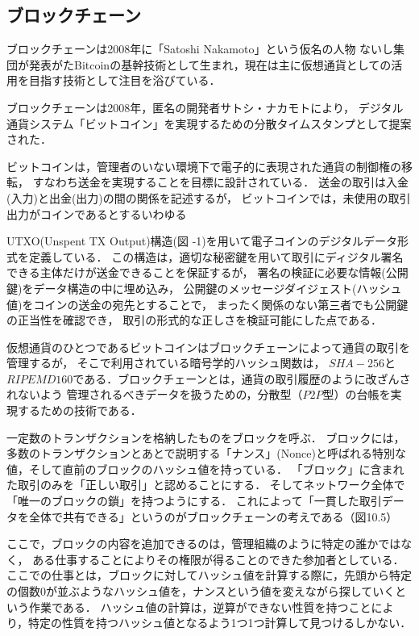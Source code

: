 \documentclass[a4paper,12pt]{jsarticle}
\begin{document}
      \subsection{ブロックチェーン}

ブロックチェーンは2008年に「Satoshi Nakamoto」という仮名の人物
ないし集団が発表がたBitcoinの基幹技術として生まれ，現在は主に仮想通貨としての活用を目指す技術として注目を浴びている．

ブロックチェーンは2008年，匿名の開発者サトシ・ナカモトにより，
デジタル通貨システム「ビットコイン」を実現するための分散タイムスタンプとして提案された．

ビットコインは，管理者のいない環境下で電子的に表現された通貨の制御権の移転，
すなわち送金を実現することを目標に設計されている．
送金の取引は入金(入力)と出金(出力)の間の関係を記述するが，
ビットコインでは，未使用の取引出力がコインであるとするいわゆる

UTXO(Unspent TX Output)構造(図 -1)を用いて電子コインのデジタルデータ形式を定義している．
この構造は，適切な秘密鍵を用いて取引にディジタル署名できる主体だけが送金できることを保証するが，
署名の検証に必要な情報(公開鍵)をデータ構造の中に埋め込み，
公開鍵のメッセージダイジェスト(ハッシュ値)をコインの送金の宛先とすることで，
まったく関係のない第三者でも公開鍵の正当性を確認でき，
取引の形式的な正しさを検証可能にした点である．

仮想通貨のひとつであるビットコインはブロックチェーンによって通貨の取引を管理するが，
そこで利用されている暗号学的ハッシュ関数は，
$SHA-256$と$RIPEMD160$である．ブロックチェーンとは，通貨の取引履歴のように改ざんされないよう
管理されるべきデータを扱うための，分散型（$P2P$型）の台帳を実現するための技術である．

一定数のトランザクションを格納したものをブロックを呼ぶ．
ブロックには，多数のトランザクションとあとで説明する「ナンス」(Nonce)と呼ばれる特別な値，そして直前のブロックのハッシュ値を持っている．
「ブロック」に含まれた取引のみを「正しい取引」と認めることにする．
そしてネットワーク全体で「唯一のブロックの鎖」を持つようにする．
これによって「一貫した取引データを全体で共有できる」というのがブロックチェーンの考えである（図10.5）


ここで，ブロックの内容を追加できるのは，管理組織のように特定の誰かではなく，
ある仕事することによりその権限が得ることのできた参加者としている．
ここでの仕事とは，ブロックに対してハッシュ値を計算する際に，先頭から特定の個数$0$が並ぶようなハッシュ値を，ナンスという値を変えながら探していくという作業である．
ハッシュ値の計算は，逆算ができない性質を持つことにより，特定の性質を持つハッシュ値となるよう1つ1つ計算して見つけるしかない．
\end{document}
